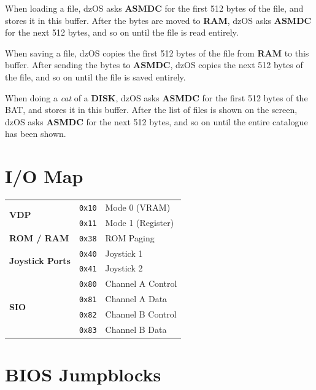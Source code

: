 \documentclass[a4paper,11pt]{article}
\begin{document}
    When loading a file, dzOS asks \textbf{ASMDC} for the first 512 bytes of the
    file, and stores it in this buffer. After the bytes are moved to
    \textbf{RAM}, dzOS asks \textbf{ASMDC} for the next 512 bytes, and so on
    until the file is read entirely.

    When saving a file, dzOS copies the first 512 bytes of the file from
    \textbf{RAM} to this buffer. After sending the bytes to \textbf{ASMDC}, dzOS
    copies the next 512 bytes of the file, and so on until the file is saved
    entirely.

    When doing a \textit{cat} of a \textbf{DISK}, dzOS asks \textbf{ASMDC} for
    the first 512 bytes of the BAT, and stores it in this buffer. After the list
    of files is shown on the screen, dzOS asks \textbf{ASMDC} for the next 512
    bytes, and so on until the entire catalogue has been shown.

    \pagebreak
    \section{I/O Map}

    \begin{tabular}{l l l }
        \hline
        \multirow{2}{*}{\textbf{VDP}} & \texttt{0x10} & Mode 0 (VRAM)\\
        & \texttt{0x11} & Mode 1 (Register)\\
        \hline
        \textbf{ROM / RAM} & \texttt{0x38} & ROM Paging\\
        \hline
        \multirow{2}{*}{\textbf{Joystick Ports}} & \texttt{0x40} 
        & Joystick 1\\
        & \texttt{0x41} & Joystick 2\\
        \hline
        \multirow{4}{*}{\textbf{SIO}} & \texttt{0x80} & Channel A Control\\
        & \texttt{0x81} & Channel A Data\\
        & \texttt{0x82} & Channel B Control\\
        & \texttt{0x83} & Channel B Data\\
        \hline
    \end{tabular}

    \pagebreak
    \section{BIOS Jumpblocks}
\end{document}
